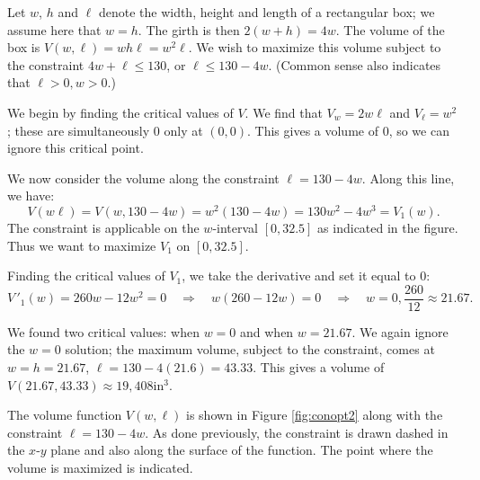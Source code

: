 {Let $w$, $h$ and $\ell$ denote the width, height and length of a rectangular box; we assume here that $w=h$. The girth is then $2(w+h) = 4w$. The volume of the box is $V(w,\ell) = wh\ell = w^2\ell$. We wish to maximize this volume subject to the constraint $4w+\ell\leq 130$, or $\ell\leq 130-4w$. (Common sense also indicates that $\ell>0, w>0$.)

We begin by finding the critical values of $V$. We find that $V_w = 2w\ell$ and $V_\ell = w^2$; these are simultaneously 0 only at $(0,0)$. This gives a volume of 0, so we can ignore this critical point. 

We now consider the volume along the constraint $\ell=130-4w.$ Along this line, we have:
$$V(w\ell) = V(w,130-4w) = w^2(130-4w) = 130w^2-4w^3 = V_1(w).$$
The constraint is applicable on the $w$-interval $[0,32.5]$ as indicated in the figure. Thus we want to maximize $V_1$ on $[0,32.5]$. 

Finding the critical values of $V_1$, we take the derivative and set it equal to 0:
$$V\,'_1(w) = 260w-12w^2 = 0 \quad \Rightarrow \quad w(260-12w)= 0 \quad \Rightarrow \quad w=0,\frac{260}{12}\approx 21.67.$$

We found two critical values: when $w=0$ and when $w=21.67$. We again ignore the $w=0$ solution; the maximum volume, subject to the constraint, comes at $w=h=21.67$, $\ell = 130-4(21.6) =43.33.$ This gives a volume of $V(21.67,43.33) \approx 19,408$in$^3$. 


The volume function $V(w,\ell)$ is shown in Figure \ref{fig:conopt2} along with the constraint $\ell = 130-4w$. As done previously, the constraint is drawn dashed in the $x$-$y$ plane and also along the surface of the function. The point where the volume is maximized is indicated.
}\\

